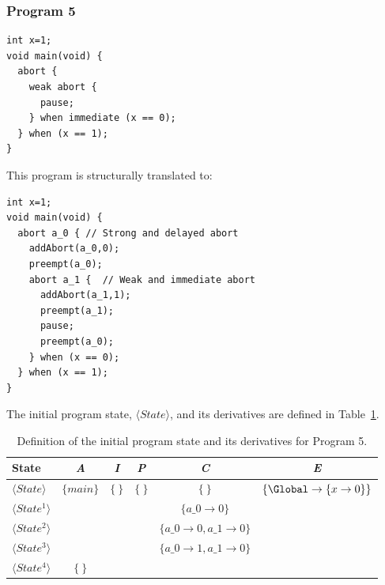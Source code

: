 \subsubsection{Program 5}
\begin{lstlisting}[style=snippet]
int x=1;
void main(void) {
  abort {
    weak abort {
      pause;
    } when immediate (x == 0);
  } when (x == 1);
}
\end{lstlisting}
This program is structurally translated to:
\begin{lstlisting}[style=snippet]
int x=1;
void main(void) {
  abort a_0 { // Strong and delayed abort
    addAbort(a_0,0); 
    preempt(a_0);
    abort a_1 {  // Weak and immediate abort
      addAbort(a_1,1); 
      preempt(a_1); 
      pause; 
      preempt(a_0);
    } when (x == 0);
  } when (x == 1);
}
\end{lstlisting}
The initial program state, $\langle State \rangle$,
and its derivatives are defined in Table~\ref{table:forec_program_5}.
\newline

\begin{table}[t]
	\centering
	\renewcommand{\arraystretch}{1.25}
	
	\begin{tabular}{| l | c | c | c | c | c |}
		\hline
		\textbf{State}						& \textbf{\textit{A}}			& \textbf{\textit{I}} 		& \textbf{\textit{P}} 	& \textbf{\textit{C}}	 					& \textbf{\textit{E}}										\\ \hline
		$\langle State \rangle$				& $\lbrace main \rbrace$		& $\lbrace ~ \rbrace$		& $\lbrace ~ \rbrace$	& $\lbrace ~ \rbrace$						& $\lbrace \Global \to \lbrace x \to 0 \rbrace \rbrace$		\\ \cline{1-1} \cline{5-5}
		$\langle State^1 \rangle$			&								&							&						& $\lbrace a\_0 \to 0 \rbrace$				& 															\\ \cline{1-1} \cline{5-5}
		$\langle State^2 \rangle$			&								&							&						& $\lbrace a\_0 \to 0, a\_1 \to 0 \rbrace$	& 															\\ \cline{1-1} \cline{5-5}
		$\langle State^3 \rangle$			& 								& 							&						& $\lbrace a\_0 \to 1, a\_1 \to 0 \rbrace$	& 															\\ \cline{1-2}
		$\langle State^4 \rangle$			& $\lbrace ~ \rbrace$			& 							&						&											& 															\\ \hline
	\end{tabular}
	
	\caption{Definition of the initial program state and its derivatives for Program 5.}
	\label{table:forec_program_5}
\end{table}

